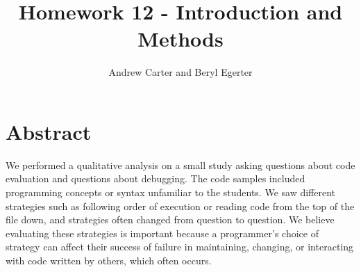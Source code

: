 \documentclass{article}
\title{Homework 12 - Introduction and Methods}
\author{Andrew Carter and Beryl Egerter}
\begin{document}
\maketitle
\section{Abstract}


We performed a qualitative analysis on a small study asking questions about code evaluation and questions about debugging.
The code samples included programming concepts or syntax unfamiliar to the students.
We saw different strategies such as following order of execution or reading code from the top of the file down, and strategies often changed from question to question.
We believe evaluating these strategies is important because a programmer's choice of strategy can affect their success of failure in maintaining, changing, or interacting with code written by others, which often occurs. 


\end{document}
